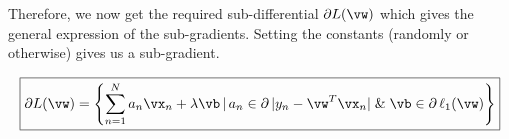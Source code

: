 \documentclass[a4paper,12pt]{article}
\begin{document}
\begin{mlsolution}
Therefore, we now get the required sub-differential $\partial L(\vw)$ which gives the general expression of the sub-gradients. Setting the constants (randomly or otherwise) gives us a sub-gradient.

\[
\boxed{
\partial L(\vw) = \bc{ \sum_{n=1}^{N} a_n\vx_n + \lambda \vb\cond a_n \in \partial\,|y_n-\vw^T\vx_n|\;\&\;\vb \in \partial\,\ell_1(\vw)}
}
\]

    

\end{mlsolution}
\end{document}
